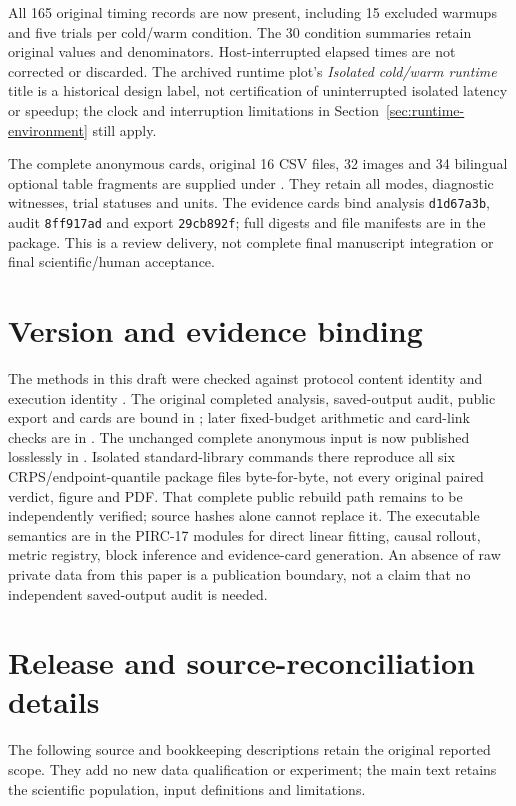 All 165 original timing records are now present, including 15 excluded
warmups and five trials per cold/warm condition. The 30 condition summaries
retain original values and denominators. Host-interrupted elapsed times
are not corrected or discarded. The archived runtime plot's
\emph{Isolated cold/warm runtime} title is a historical design label,
not certification of uninterrupted isolated latency or speedup;
the clock and interruption limitations in
Section~\ref{sec:runtime-environment} still apply.

The complete anonymous cards, original 16 CSV files, 32 images and 34
bilingual optional table fragments are supplied under
.
They retain all modes, diagnostic witnesses, trial statuses and units.
The evidence cards bind analysis \texttt{d1d67a3b}, audit
\texttt{8ff917ad} and export \texttt{29cb892f}; full digests and file
manifests are in the package. This is a review delivery, not complete
final manuscript integration or final scientific/human acceptance.
\FloatBarrier



\section{Version and evidence binding}
The methods in this draft were checked against protocol content identity
and execution identity
.
The original completed analysis, saved-output audit, public export and cards
are bound in ; later fixed-budget arithmetic
and card-link checks are in .
The unchanged complete anonymous input is now published losslessly in
. Isolated standard-library commands there
reproduce all six CRPS/endpoint-quantile package files byte-for-byte, not every
original paired verdict, figure and PDF. That complete public rebuild path
remains to be independently verified; source hashes alone cannot replace it.
The executable semantics are in the PIRC-17 modules for direct linear fitting,
causal rollout, metric registry, block inference and evidence-card generation.
An absence of raw private data from this paper is a publication boundary, not
a claim that no independent saved-output audit is needed.


\section{Release and source-reconciliation details}
\label{sec:source-reconciliation-details}\hypertarget{sec:source-reconciliation-details}{}
The following source and bookkeeping descriptions retain the original
reported scope. They add no new data qualification or experiment; the
main text retains the scientific population, input definitions and limitations.

